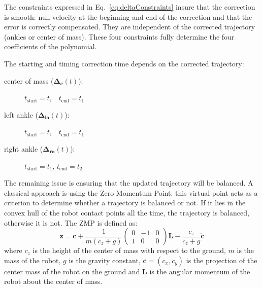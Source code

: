 The constraints expressed in Eq.~\ref{eq:deltaConstraints} insure that
the correction is smooth: null velocity at the beginning and end of
the correction and that the error is correctly compensated. They are
independent of the corrected trajectory (ankles or center of
mass). These four constraints fully determine the four coefficients of
the polynomial.

The starting and timing correction time depends on the corrected trajectory:
\begin{description}
\item[center of mass ($\mathbf{\Delta_c}(t)$):]\hspace{3cm}
  $t_{\text{start}} = t$,~~$t_{\text{end}} = t_1$
\item[left ankle ($\mathbf{\Delta_{\text{la}}}(t)$):]\hspace{3cm}
  $t_{\text{start}} = t$,~~$t_{\text{end}} = t_1$
\item[right ankle ($\mathbf{\Delta_{\text{ra}}}(t)$):]\hspace{3cm}
  $t_{\text{start}} = t_1$, $t_{\text{end}} = t_2$
\end{description}


The remaining issue is ensuring that the updated trajectory will be
balanced. A classical approach is using the Zero Momentum Point: this
virtual point acts as a criterion to determine whether a trajectory is
balanced or not. If it lies in the convex hull of the robot contact
points all the time, the trajectory is balanced, otherwise it is
not. The ZMP is defined as:
%
\begin{equation} \label{eq:zmp1}
  \mathbf{z} = \mathbf{c} + \frac{1}{m(\ddot{c}_z +
    g)}\left(\begin{array}{ccc} 0 &-1 &0\\1 &0 &0\end{array}\right)
    \mathbf{\dot{\textbf{L}}} - \frac{c_z}{\ddot{c}_z + g}
    \ddot{\mathbf{c}}
\end{equation}
%
where $c_z$ is the height of the center of mass with respect to the
ground, $m$ is the mass of the robot, $g$ is the gravity constant,
\mbox{$\mathbf{c}=(c_x,c_y)$} is the projection of the center mass of
the robot on the ground and $\textbf{L}$ is the angular momentum of
the robot about the center of mass.


